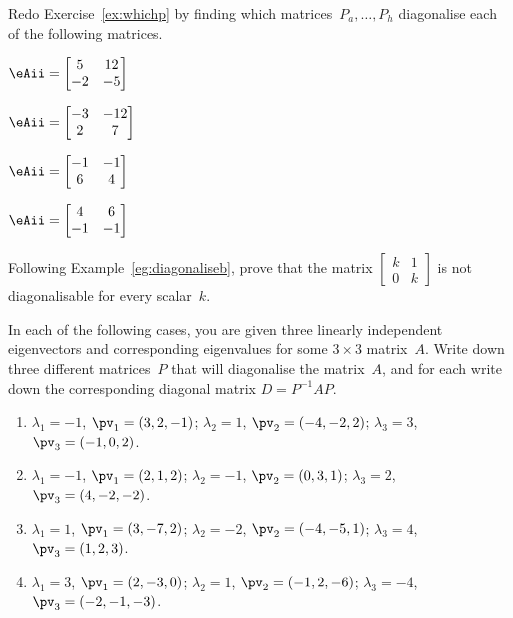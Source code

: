 \begin{exercise} \label{ex:whichps} 
Redo Exercise~\ref{ex:whichp} by finding which matrices~\(P_a,\ldots,P_h\) diagonalise each of the following matrices.
\begin{parts}
\item \(\eAii=\begin{bmatrix} 5&12\\-2&-5 \end{bmatrix}\)
\item \(\eAii=\begin{bmatrix} -3&-12\\2&7 \end{bmatrix}\)
\item \(\eAii=\begin{bmatrix} -1&-1\\6&4 \end{bmatrix}\)
\item \(\eAii=\begin{bmatrix} 4&6\\-1&-1 \end{bmatrix}\)
\end{parts}
\end{exercise}




\begin{exercise} \label{ex:} 
Following Example~\ref{eg:diagonaliseb}, prove that the matrix \(\begin{bmatrix} k&1\\0&k \end{bmatrix}\) is not diagonalisable for every scalar~\(k\).
\end{exercise}




\begin{exercise} \label{ex:} 
In each of the following cases, you are given three linearly independent eigenvectors and corresponding eigenvalues for some \(3\times3\) matrix~\(A\).
Write down three different matrices~\(P\) that will diagonalise the matrix~\(A\), and for each write down the corresponding diagonal matrix \(D=P^{-1}AP\).
\begin{enumerate}
\item \(\lambda_1=-1\), \(\pv_1=(3,2,-1)\);
\(\lambda_2=1\), \(\pv_2=(-4,-2,2)\);
\(\lambda_3=3\), \(\pv_3=(-1,0,2)\).

\item \(\lambda_1=-1\), \(\pv_1=( 2,1,2)\);
\(\lambda_2=-1\), \(\pv_2=(0,3,1)\);
\(\lambda_3=2\), \(\pv_3=(4,-2,-2)\).

\item \(\lambda_1=1\), \(\pv_1=(3,-7,2)\);
\(\lambda_2=-2\), \(\pv_2=(-4,-5,1)\);
\(\lambda_3=4\), \(\pv_3=(1,2,3)\).

\item \(\lambda_1=3\), \(\pv_1=(2,-3,0)\);
\(\lambda_2=1\), \(\pv_2=(-1,2,-6)\);
\(\lambda_3=-4\), \(\pv_3=(-2,-1,-3)\).

\end{enumerate}
\end{exercise}





